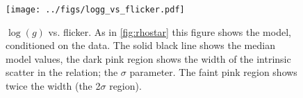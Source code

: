 \begin{figure}
\begin{center}
\texttt{[image: ../figs/logg\_vs\_flicker.pdf]}
\caption{
$\log(g)$ vs. flicker. As in \ref{fig:rhostar} this figure shows
the model, conditioned on the data. The solid black line shows the median model
values, the dark pink region shows the width of the intrinsic scatter in the
relation; the $\sigma$ parameter. The faint pink region shows twice the width
(the 2$\sigma$ region).
}
\label{fig:logg}
\end{center}
\end{figure}
